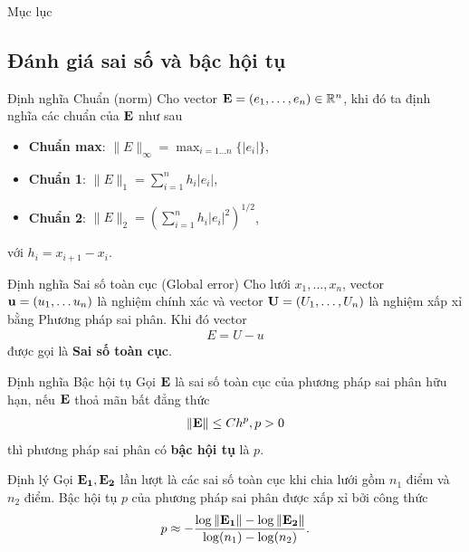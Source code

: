 \documentclass[9pt]{beamer}
\numberwithin{equation}{section}
\begin{document}
\begin{frame}{Mục lục}
    \tableofcontents[currentsection, sections={3-4}]
\end{frame}

\subsection{Đánh giá sai số và bậc hội tụ}

\begin{frame}
\begin{block}{Định nghĩa Chuẩn (norm)}
    Cho vector ${\bf E} = (e_1,\ldots,e_n) \in \mathbb{R}^n$, khi đó ta định nghĩa các chuẩn của ${\bf E}$ như sau
    \begin{itemize}
        \item \textbf{Chuẩn max}: $\|E\|_{\infty} = \max_{i = 1 \ldots n} \{|e_i|\}$,
        \item \textbf{Chuẩn 1}: $\|E\|_1 = \sum_{i=1}^n h_i |e_i|$,
        \item \textbf{Chuẩn 2}: $\|E\|_2 = \left(\sum_{i=1}^n h_i |e_i|^2\right)^{1/2}$,
    \end{itemize}
    với $h_i = x_{i+1} - x_i$.
\end{block}

\begin{block}{Định nghĩa Sai số toàn cục (Global error)}
    Cho lưới $x_1,\ldots,x_n$, vector ${\bf u} = (u_1,\ldots u_n)$ là nghiệm chính xác và vector ${\bf U} = (U_1,\ldots,U_n)$ là nghiệm xấp xỉ bằng Phương pháp sai phân. Khi đó vector
    \begin{align*}
        E = U - u
    \end{align*}
    được gọi là \textbf{Sai số toàn cục}.
\end{block}
\end{frame}

\begin{frame}
\begin{block}{Định nghĩa Bậc hội tụ}
    Gọi ${\bf E}$ là sai số toàn cục của phương pháp sai phân hữu hạn, nếu ${\bf E}$ thoả mãn bất đẳng thức
    \begin{align*}
        \|{\bf E}\| \le Ch^p, p > 0
    \end{align*}
    thì phương pháp sai phân có \textbf{bậc hội tụ} là $p$.
\end{block}

\begin{exampleblock}{Định lý}
    Gọi ${\bf E_1}, {\bf E_2}$ lần lượt là các sai số toàn cục khi chia lưới gồm $n_1$ điểm và $n_2$ điểm. Bậc hội tụ $p$ của phương pháp sai phân được xấp xỉ bởi công thức
    \begin{align*}
        p \approx - \frac{\log \|{\bf E_1}\| - \log \|{\bf E_2}\|}{\log(n_1) - \log(n_2)}.
    \end{align*}
\end{exampleblock}
\end{frame}
\end{document}
